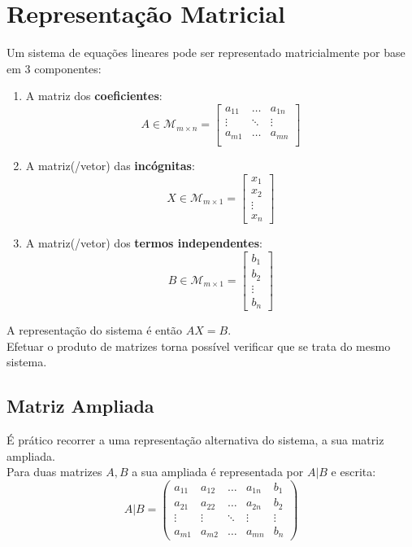 \documentclass[]{report}
\begin{document}
\section{Representação Matricial}
Um sistema de equações lineares pode ser representado matricialmente por base em 3 componentes:
\begin{enumerate}
\item A matriz dos \textbf{coeficientes}:
$$
A \in \mathcal{M}_{m \times n} =
\begin{bmatrix}
a_{11} & \dots & a_{1n}\\
\vdots & \ddots & \vdots\\
a_{m1} & \dots & a_{mn}\\
\end{bmatrix}
$$
\item A matriz(/vetor) das \textbf{incógnitas}:
$$
X \in \mathcal{M}_{m \times 1} =
\begin{bmatrix}
x_1\\
x_2\\
\vdots \\
x_n
\end{bmatrix}
$$
\item A matriz(/vetor) dos \textbf{termos independentes}:
$$
B \in \mathcal{M}_{m \times 1} =
\begin{bmatrix}
b_1\\
b_2\\
\vdots \\
b_n
\end{bmatrix}
$$
\end{enumerate}
A representação do sistema é então $AX=B$.\\
Efetuar o produto de matrizes torna possível verificar que se trata do mesmo sistema.
\subsection{Matriz Ampliada}
É prático recorrer a uma representação alternativa do sistema, a sua matriz ampliada.\\
Para duas matrizes $A, B$ a sua ampliada é representada por $A|B$ e escrita:
$$
A|B=
  \left(\begin{array}{cccc|c}
    a_{11} & a_{12} & \dots &a_{1n} & b_1 \\
    a_{21} & a_{22} & \dots &a_{2n} & b_2 \\
    \vdots & \vdots & \ddots &\vdots & \vdots \\
    a_{m1} & a_{m2} & \dots &a_{mn} & b_n
  \end{array}\right)
$$
\end{document}
